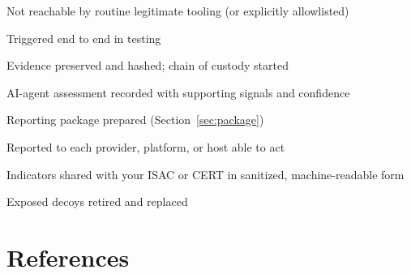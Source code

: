 \documentclass[11pt,letterpaper]{article}
\begin{document}
\begin{tcbraster}[raster columns=3, raster equal height, raster column skip=8pt, raster valign=top]
\begin{tcolorbox}[checkcard, colframe=darkamber, colbacktitle=darkamber, title={\ding{110}\hspace{0.4em}Per decoy}]
\begin{checklist}
  \item Not reachable by routine legitimate tooling (or explicitly allowlisted)
  \item Triggered end to end in testing
\end{checklist}
\end{tcolorbox}
\begin{tcolorbox}[checkcard, colframe=campaignred, colbacktitle=campaignred, title={\ding{110}\hspace{0.4em}On a confirmed event}]
\begin{checklist}
  \item Evidence preserved and hashed; chain of custody started
  \item AI-agent assessment recorded with supporting signals and confidence
  \item Reporting package prepared (Section~\ref{sec:package})
  \item Reported to each provider, platform, or host able to act
  \item Indicators shared with your ISAC or CERT in sanitized, machine-readable form
  \item Exposed decoys retired and replaced
\end{checklist}
\end{tcolorbox}
\end{tcbraster}

\section{References}
\label{sec:refs}
\end{document}

